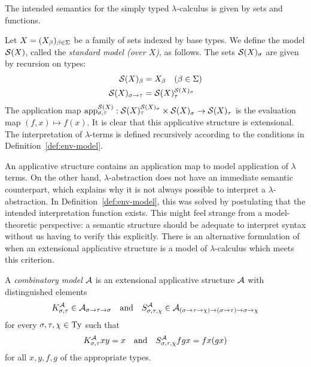 The intended semantics for the simply typed $\lambda$-calculus is given by sets and functions.

\begin{ex}
Let $X = (X_\beta)_{\beta \in \Sigma}$ be a family of sets indexed by base types. We define the model $\mathcal{S}(X)$, called the \emph{standard model (over $X$)}, as follows. The sets $\mathcal{S}(X)_\sigma$ are given by recursion on types:
\begin{align*}
\mathcal{S}(X)_\beta &= X_\beta \quad (\beta \in \Sigma) \\
\mathcal{S}(X)_{\sigma \to \tau} &= \mathcal{S}(X)_\tau^{\mathcal{S}(X)_\sigma}
\end{align*}
The application map $\sapp[\sigma,\tau][\stdmod{X}] : \cartprod{\funcset{\stdmod{X}_\sigma}{\stdmod{X}_\tau}}{\stdmod{X}_\sigma} \to \stdmod{X}_\tau$ is the evaluation map $(f, x) \mapsto f(x)$. It is clear that this applicative structure is extensional. The interpretation of $\lambda$-terms is defined recursively according to the conditions in Definition~\ref{def:env-model}.
\end{ex}

An applicative structure contains an application map to model application of $\lambda$ terms. On the other hand, $\lambda$-abstraction does not have an immediate semantic counterpart, which explains why it is not always possible to interpret a $\lambda$-abstraction. In Definition~\ref{def:env-model}, this was solved by postulating that the intended interpretation function exists. This might feel strange from a model-theoretic perspective: a semantic structure should be adequate to interpret syntax without us having to verify this explicitly. There is an alternative formulation of when an extensional applicative structure is a model of $\lambda$-calculus which meets this criterion.

\begin{defn} \label{def:comb-model}
A \emph{combinatory model} $\mathcal{A}$ is an extensional applicative structure $\mathcal{A}$  with distinguished elements
\[ K^{\mathcal{A}}_{\sigma,\tau} \in \mathcal{A}_{\sigma \to \tau \to \sigma}
    \quad\text{and}\quad
    S^{\mathcal{A}}_{\sigma,\tau,\chi} \in \mathcal{A}_{(\sigma \to \tau \to \chi) \to (\sigma \to \tau) \to \sigma \to \chi} \]
for every $\sigma, \tau, \chi \in \mathrm{Ty}$ such that
\begin{equation} \label{eq:comb-model-KS}
K^{\mathcal{A}}_{\sigma,\tau}xy = x \quad\text{and}\quad
    S^{\mathcal{A}}_{\sigma,\tau,\chi}fgx = fx(gx)
\end{equation}
for all $x, y, f, g$ of the appropriate types.
\end{defn}

